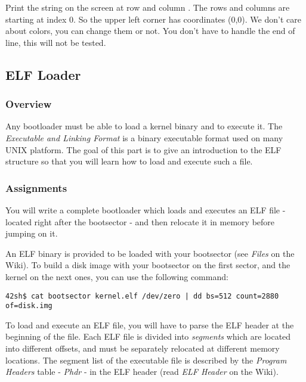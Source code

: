 {
  Print the string  on the screen at row 
  and column . The rows and columns are starting at index 0.
  So the upper left corner has coordinates (0,0).
  We don't care about colors, you can change them or not.
  You don't have to handle the end of line, this will not be tested.
}

%
%

\newpage

\subsection{ELF Loader}

\subsubsection*{Overview}
Any bootloader must be able to load a kernel binary and to execute it.
The \emph{Executable and Linking Format} is a binary executable format used on
many UNIX platform. The goal of this part is to give an introduction to the
ELF structure so that you will learn how to load and execute such a file.

\subsubsection*{Assignments}
You will write a complete bootloader which loads and executes an ELF file
- located right after the bootsector - and then relocate it in memory
before jumping on it.

An ELF binary is provided to be loaded with your bootsector (see \emph{Files}
on the Wiki). To build a disk image with your bootsector on the first sector,
and the kernel on the next ones, you can use the following command:

\begin{verbatim}
42sh$ cat bootsector kernel.elf /dev/zero | dd bs=512 count=2880 of=disk.img
\end{verbatim}

To load and execute an ELF file, you will have to parse the ELF header at the
beginning of the file. Each ELF file is divided into \emph{segments} which are
located into different offsets, and must be separately relocated at different
memory locations. The segment list of the executable file is described by the
\emph{Program Headers} table - \emph{Phdr} - in the ELF header (read \emph{ELF Header} on the Wiki).

